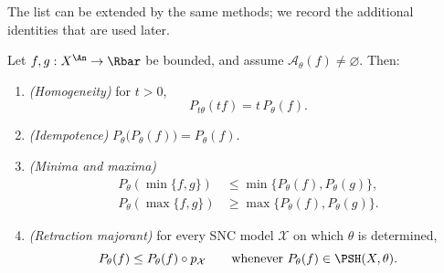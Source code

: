 The list can be extended by the same methods; we record the additional
identities that are used later.

\begin{proposition}
\label{prop:ch23-further-calculus}
Let \(f,g:X^{\An}\to\Rbar\) be bounded, and assume
\(\mathcal A_\theta(f)\ne\varnothing\).  Then:
\begin{enumerate}
\item \emph{(Homogeneity)} for \(t>0\),
\begin{equation}\label{eq:ch23-homogeneity}
 P_{t\theta}(tf)=t\,P_\theta(f).
\end{equation}
\item \emph{(Idempotence)} \(P_\theta\bigl(P_\theta(f)\bigr)=P_\theta(f)\).
\item \emph{(Minima and maxima)}
\begin{equation}\label{eq:ch23-min-max}
 \begin{aligned}
 P_\theta(\min\{f,g\})&\leq\min\{P_\theta(f),P_\theta(g)\},\\
 P_\theta(\max\{f,g\})&\geq\max\{P_\theta(f),P_\theta(g)\}.
 \end{aligned}
\end{equation}
\item \emph{(Retraction majorant)} for every SNC model \(\mathcal X\) on
which \(\theta\) is determined,
\begin{equation}\label{eq:ch23-envelope-retraction-bound}
 P_\theta(f)\leq P_\theta(f)\circ p_{\mathcal X}
 \qquad\text{whenever }P_\theta(f)\in\PSH(X,\theta).
\end{equation}
\end{enumerate}
\end{proposition}

